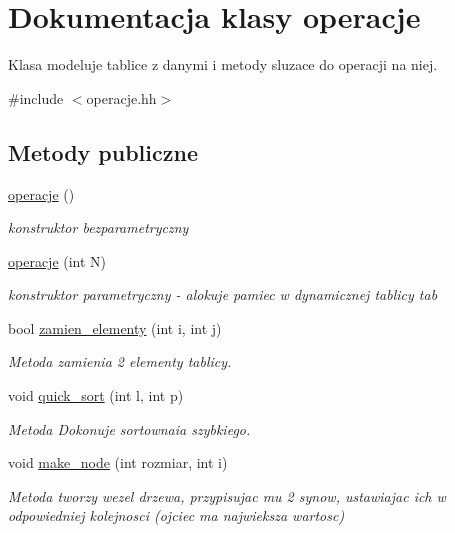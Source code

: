 \hypertarget{classoperacje}{\section{\-Dokumentacja klasy operacje}
\label{classoperacje}
}


\-Klasa modeluje tablice z danymi i metody sluzace do operacji na niej.  




{\ttfamily \#include $<$operacje.\-hh$>$}

\subsection*{\-Metody publiczne}
\begin{DoxyCompactItemize}
\item 
\hyperlink{classoperacje_a4538e0bfde26291449dc057134b23ad8}{operacje} ()
\begin{DoxyCompactList}\small\item\em konstruktor bezparametryczny \end{DoxyCompactList}\item 
\hyperlink{classoperacje_af109f7f9a4b10334d5e8c215c7f220de}{operacje} (int \-N)
\begin{DoxyCompactList}\small\item\em konstruktor parametryczny -\/ alokuje pamiec w dynamicznej tablicy {\ttfamily tab} \end{DoxyCompactList}\item 
bool \hyperlink{classoperacje_a7393a8b3b394921a084e0c1f4ad517b7}{zamien\-\_\-elementy} (int i, int j)
\begin{DoxyCompactList}\small\item\em \-Metoda zamienia 2 elementy tablicy. \end{DoxyCompactList}\item 
void \hyperlink{classoperacje_a7aa29c588e5a8f93c437150f03a133f1}{quick\-\_\-sort} (int l, int p)
\begin{DoxyCompactList}\small\item\em \-Metoda \-Dokonuje sortownaia szybkiego. \end{DoxyCompactList}\item 
void \hyperlink{classoperacje_a9be241905b909e7aef0151902c6f5b81}{make\-\_\-node} (int rozmiar, int i)
\begin{DoxyCompactList}\small\item\em \-Metoda tworzy wezel drzewa, przypisujac mu 2 synow, ustawiajac ich w odpowiedniej kolejnosci (ojciec ma najwieksza wartosc) \end{DoxyCompactList}\item 

\end{DoxyCompactItemize}
